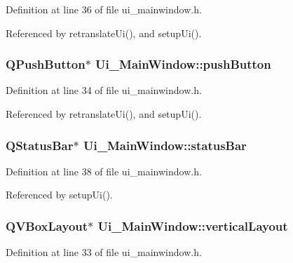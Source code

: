 Definition at line 36 of file ui\-\_\-mainwindow.\-h.



Referenced by retranslate\-Ui(), and setup\-Ui().

\hypertarget{class_ui___main_window_ad332d93084584930878f1daf5f84cdbf}{
\subsubsection[{push\-Button}]{\setlength{\rightskip}{0pt plus 5cm}Q\-Push\-Button$\ast$ Ui\-\_\-\-Main\-Window\-::push\-Button}}\label{class_ui___main_window_ad332d93084584930878f1daf5f84cdbf}


Definition at line 34 of file ui\-\_\-mainwindow.\-h.



Referenced by retranslate\-Ui(), and setup\-Ui().

\hypertarget{class_ui___main_window_a50fa481337604bcc8bf68de18ab16ecd}{
\subsubsection[{status\-Bar}]{\setlength{\rightskip}{0pt plus 5cm}Q\-Status\-Bar$\ast$ Ui\-\_\-\-Main\-Window\-::status\-Bar}}\label{class_ui___main_window_a50fa481337604bcc8bf68de18ab16ecd}


Definition at line 38 of file ui\-\_\-mainwindow.\-h.



Referenced by setup\-Ui().

\hypertarget{class_ui___main_window_aecd96a04789fcfec3f98d80390ad8184}{
\subsubsection[{vertical\-Layout}]{\setlength{\rightskip}{0pt plus 5cm}Q\-V\-Box\-Layout$\ast$ Ui\-\_\-\-Main\-Window\-::vertical\-Layout}}\label{class_ui___main_window_aecd96a04789fcfec3f98d80390ad8184}


Definition at line 33 of file ui\-\_\-mainwindow.\-h.




